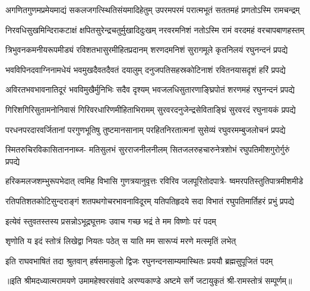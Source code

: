 


\addtocounter{shlokacount}{43}

\fourlineindentedshloka
{अगणितगुणमप्रमेयमाद्यं}
{सकलजगत्स्थितिसंयमादिहेतुम्}
{उपरमपरमं परात्मभूतं}
{सततमहं प्रणतोऽस्मि रामचन्द्रम्} %

\fourlineindentedshloka
{निरवधिसुखमिन्दिराकटाक्षं}
{क्षपितसुरेन्द्रचतुर्मुखादिदुःखम्}
{नरवरमनिशं नतोऽस्मि रामं}
{वरदमहं वरचापबाणहस्तम्} %

\fourlineindentedshloka
{त्रिभुवनकमनीयरूपमीड्यं}
{रविशतभासुरमीहितप्रदानम्}
{शरणदमनिशं सुरागमूले}
{कृतनिलयं रघुनन्दनं प्रपद्ये} %

\fourlineindentedshloka
{भवविपिनदवाग्निनामधेयं}
{भवमुखदैवतदैवतं दयालुम्}
{दनुजपतिसहस्रकोटिनाशं}
{रवितनयासदृशं हरिं प्रपद्ये} %

\fourlineindentedshloka
{अविरतभवभावनातिदूरं}
{भवविमुखैर्मुनिभिः सदैव दृश्यम्}
{भवजलधिसुतारणाङ्घ्रिपोतं}
{शरणमहं रघुनन्दनं प्रपद्ये} %

\fourlineindentedshloka
{गिरिशगिरिसुतामनोनिवासं}
{गिरिवरधारिणमीहिताभिरामम्}
{सुरवरदनुजेन्द्रसेविताङ्घ्रिं}
{सुरवरदं रघुनायकं प्रपद्ये} %

\fourlineindentedshloka
{परधनपरदारवर्जितानां}
{परगुणभूतिषु तुष्टमानसानाम्}
{परहितनिरतात्मनां सुसेव्यं}
{रघुवरमम्बुजलोचनं प्रपद्ये} %

\fourlineindentedshloka
{स्मितरुचिरविकासिताननाब्ज-}
{मतिसुलभं सुरराजनीलनीलम्}
{सितजलरुहचारुनेत्रशोभं}
{रघुपतिमीशगुरोर्गुरुं प्रपद्ये} %

\fourlineindentedshloka
{हरिकमलजशम्भुरूपभेदात्}
{त्वमिह विभासि गुणत्रयानुवृत्तः}
{रविरिव जलपूरितोदपात्रे-}
{ष्वमरपतिस्तुतिपात्रमीशमीडे} %

\fourlineindentedshloka
{रतिपतिशतकोटिसुन्दराङ्गं}
{शतपथगोचरभावनाविदूरम्}
{यतिपतिहृदये सदा विभातं}
{रघुपतिमार्तिहरं प्रभुं प्रपद्ये} %

\twolineshloka
{इत्येवं स्तुवतस्तस्य प्रसन्नोऽभूद्रघूत्तमः}
{उवाच गच्छ भद्रं ते मम विष्णोः परं पदम्} %

\twolineshloka
{शृणोति य इदं स्तोत्रं लिखेद्वा नियतः पठेत्}
{स याति मम सारूप्यं मरणे मत्स्मृतिं लभेत्} %

\fourlineindentedshloka
{इति राघवभाषितं तदा}
{श्रुतवान् हर्षसमाकुलो द्विजः}
{रघुनन्दनसाम्यमास्थितः}
{प्रययौ ब्रह्मसुपूजितं पदम्} %

{॥इति श्रीमदध्यात्मरामयणे उमामहेश्वरसंवादे
अरण्यकाण्डे अष्टमे  सर्गे  जटायुकृतं  श्री-रामस्तोत्रं  सम्पूर्णम्॥}
